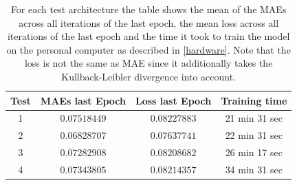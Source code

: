 \begin{center}
    \begin{table}[H]
        \centering
        \begin{tabular}{ | c | c | c | c | }
            \hline
            Test &MAEs last Epoch & Loss last Epoch & Training time\\ \hline
            1 & $0.07518449$  & $0.08227883$  & 21 min 31 sec  \\
            2 & $0.06828707$  & $0.07637741$  & 22 min 31 sec  \\
            3 & $0.07282908$  & $0.08208682$  & 26 min 17 sec  \\  
            4 & $0.07343805$  & $0.08214357$  & 34 min 31 sec  \\  
            \hline
        \end{tabular} 
        \caption{For each test architecture the table shows the mean of the MAEs across all iterations of the last
        epoch, the mean loss across all iterations of the last epoch and the time it took to train the model
        on the personal computer as described in \autoref{hardware}. Note that the loss is not the same
        as MAE since it additionally takes the Kullback-Leibler divergence into account.} \label{table_maes2}
    \end{table} 
\end{center}


